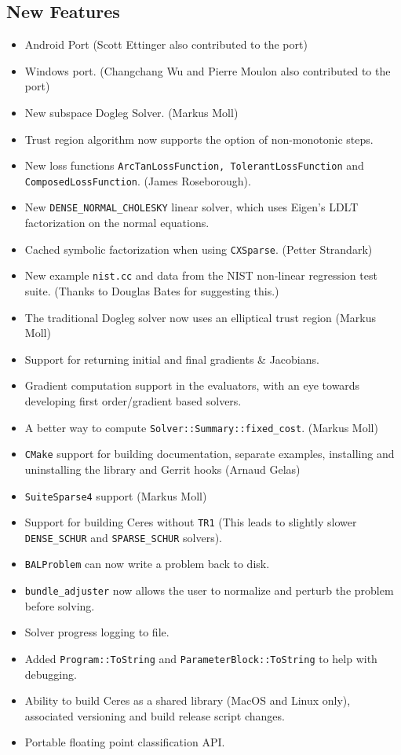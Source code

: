 \subsection{New Features}
\begin{itemize}
\item Android Port (Scott Ettinger also contributed to the port)
\item Windows port. (Changchang Wu and Pierre Moulon also contributed to the port)
\item New subspace Dogleg Solver. (Markus Moll)
\item Trust region algorithm now supports the option of non-monotonic steps.
\item New loss functions \texttt{ArcTanLossFunction,
    TolerantLossFunction} and \texttt{ComposedLossFunction}. (James Roseborough).
\item New \texttt{DENSE\_NORMAL\_CHOLESKY} linear solver, which uses Eigen's
  LDLT factorization on the normal equations.
\item Cached symbolic factorization when using \texttt{CXSparse}.
  (Petter Strandark)
\item New example \texttt{nist.cc} and data from the NIST non-linear
  regression test suite. (Thanks to Douglas Bates for suggesting this.)
\item The traditional Dogleg solver now uses an elliptical trust
  region (Markus Moll)
\item Support for returning initial and final gradients \& Jacobians.
\item Gradient computation support in the evaluators, with an eye
  towards developing first order/gradient based solvers.
\item A better way to compute \texttt{Solver::Summary::fixed\_cost}. (Markus Moll)
\item \texttt{CMake} support for building documentation, separate examples,
  installing and uninstalling the library and Gerrit hooks (Arnaud
  Gelas)
\item \texttt{SuiteSparse4} support (Markus Moll)
\item Support for building Ceres without \texttt{TR1} (This leads to
  slightly slower \texttt{DENSE\_SCHUR} and \texttt{SPARSE\_SCHUR} solvers).
\item \texttt{BALProblem} can now write a problem back to disk.
\item \texttt{bundle\_adjuster} now allows the user to normalize and perturb the
  problem before solving.
\item Solver progress logging to file.
\item Added \texttt{Program::ToString} and
  \texttt{ParameterBlock::ToString}  to help with debugging.
\item Ability to build Ceres as a shared library (MacOS and Linux only), associated versioning and build release script changes.
\item Portable floating point classification API.
\end{itemize}

